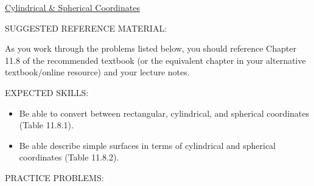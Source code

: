 \documentclass[12pt]{article}
\begin{document}
\begin{center}
\underline{\LARGE{Cylindrical \& Spherical Coordinates}}
\end{center}

\noindent SUGGESTED REFERENCE MATERIAL:

\bigskip

\noindent As you work through the problems listed below, you should reference Chapter 11.8 of the recommended textbook (or the equivalent chapter in your alternative textbook/online resource) and your lecture notes.

\bigskip

\noindent EXPECTED SKILLS:

\begin{itemize}

\item Be able to convert between rectangular, cylindrical, and spherical coordinates (Table 11.8.1). 

\item Be able describe simple surfaces in terms of cylindrical and spherical coordinates (Table 11.8.2).

\end{itemize}

\noindent PRACTICE PROBLEMS:

\medskip
\end{document}
